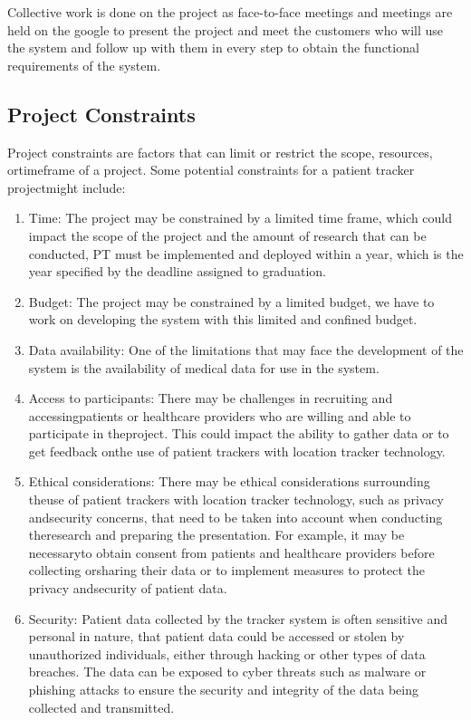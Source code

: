 \documentclass[12pt]{article}
\begin{document}
		\quad Collective work is done on the project as face-to-face meetings and meetings are held on the google to present the project and meet the customers who will use the system and follow up with them in every step to obtain the functional requirements of the system.
			
		\subsection{Project Constraints }
		
			\quad Project constraints are factors that can limit or restrict the scope, resources, ortimeframe of a project. Some potential constraints for a patient tracker projectmight include:
			\begin{enumerate}
				\item Time: The project may be constrained by a limited time frame, which could impact the scope of the project and the amount of research that can be conducted, PT must be implemented and deployed within a year, which is the year specified by the deadline assigned to graduation.
				\item Budget: The project may be constrained by a limited budget, we have to work on developing the system with this limited and confined budget.
				\item Data availability: One of the limitations that may face the development of the system is the availability of medical data for use in the system.
				\item Access to participants: There may be challenges in recruiting and accessingpatients or healthcare providers who are willing and able to participate in theproject. This could impact the ability to gather data or to get feedback onthe use of patient trackers with location tracker technology.
				\item Ethical considerations: There may be ethical considerations surrounding theuse of patient trackers with location tracker technology, such as privacy andsecurity concerns, that need to be taken into account when conducting theresearch and preparing the presentation. For example, it may be necessaryto obtain consent from patients and healthcare providers before collecting orsharing their data or to implement measures to protect the privacy andsecurity of patient data.
				\item Security: Patient data collected by the tracker system is often sensitive and personal in nature, that patient data could be accessed or stolen by unauthorized individuals, either through hacking or other types of data breaches. The data can be exposed to cyber threats such as malware or phishing attacks to ensure the security and integrity of the data being collected and transmitted.
			\end{enumerate}
\end{document}
